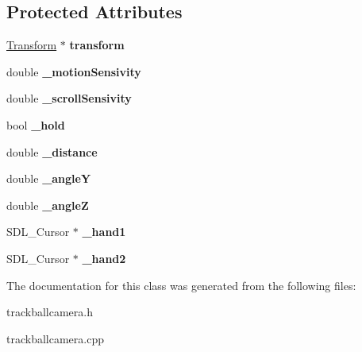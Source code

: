 \subsection*{Protected Attributes}
\begin{DoxyCompactItemize}
\item 
\hypertarget{class_track_ball_camera_af0d678af918c1887f5de5ae4b5e0960f}{
\hyperlink{class_transform}{Transform} $\ast$ {\bfseries transform}}
\label{class_track_ball_camera_af0d678af918c1887f5de5ae4b5e0960f}

\item 
\hypertarget{class_track_ball_camera_a097812817ed3ec665c76a38f71d8e133}{
double {\bfseries \_\-motionSensivity}}
\label{class_track_ball_camera_a097812817ed3ec665c76a38f71d8e133}

\item 
\hypertarget{class_track_ball_camera_ac24ec13cfb6134d7e064ba1052f08e23}{
double {\bfseries \_\-scrollSensivity}}
\label{class_track_ball_camera_ac24ec13cfb6134d7e064ba1052f08e23}

\item 
\hypertarget{class_track_ball_camera_a266fb5bce739065590ea94af85f6db96}{
bool {\bfseries \_\-hold}}
\label{class_track_ball_camera_a266fb5bce739065590ea94af85f6db96}

\item 
\hypertarget{class_track_ball_camera_aeceb35b6b038fa4f756e5098b37ef9f4}{
double {\bfseries \_\-distance}}
\label{class_track_ball_camera_aeceb35b6b038fa4f756e5098b37ef9f4}

\item 
\hypertarget{class_track_ball_camera_ad126b1c4d4e9e6bd8942015e7a19ebcc}{
double {\bfseries \_\-angleY}}
\label{class_track_ball_camera_ad126b1c4d4e9e6bd8942015e7a19ebcc}

\item 
\hypertarget{class_track_ball_camera_a785783601aa752acffad8c227a486271}{
double {\bfseries \_\-angleZ}}
\label{class_track_ball_camera_a785783601aa752acffad8c227a486271}

\item 
\hypertarget{class_track_ball_camera_ae9e9a83186de591c76ff43c7a1222d2b}{
SDL\_\-Cursor $\ast$ {\bfseries \_\-hand1}}
\label{class_track_ball_camera_ae9e9a83186de591c76ff43c7a1222d2b}

\item 
\hypertarget{class_track_ball_camera_a3cf8251a5a65b3cf5b93ddbf811d165c}{
SDL\_\-Cursor $\ast$ {\bfseries \_\-hand2}}
\label{class_track_ball_camera_a3cf8251a5a65b3cf5b93ddbf811d165c}

\end{DoxyCompactItemize}


The documentation for this class was generated from the following files:\begin{DoxyCompactItemize}
\item 
trackballcamera.h\item 
trackballcamera.cpp\end{DoxyCompactItemize}
